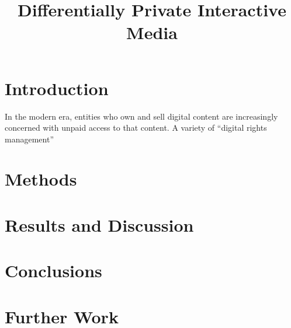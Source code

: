 \documentclass[preprint2]{aastex}
\begin{document}
\title{Differentially Private Interactive Media}

\author{} 
\vspace{0.2cm} \vspace{1cm}



\section{Introduction}

In the modern era, entities who own and sell digital content are increasingly concerned with unpaid access to that content. A variety of ``digital rights management''

\section{Methods}

\section {Results and Discussion}


\section{Conclusions}

\section{Further Work}


\end{document}
